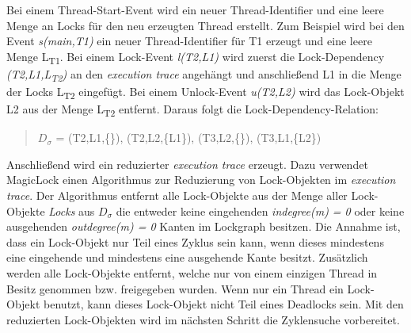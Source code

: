 Bei einem Thread-Start-Event wird ein neuer Thread-Identifier und eine leere
Menge an Locks für den neu erzeugten Thread erstellt. Zum Beispiel wird bei den
Event \textit{s(main,T1)} ein neuer Thread-Identifier für T1 erzeugt und eine
leere Menge L\textsubscript{T1}. Bei einem Lock-Event \textit{l(T2,L1)} wird
zuerst die Lock-Dependency \textit{(T2,L1,L\textsubscript{T2})} an den
\textit{execution trace} angehängt und anschließend L1 in die Menge der Locks
L\textsubscript{T2} eingefügt. Bei einem Unlock-Event \textit{u(T2,L2)} wird das
Lock-Objekt L2 aus der Menge L\textsubscript{T2} entfernt. Daraus folgt die
Lock-Dependency-Relation:
\begin{quote}
  \textbf{$D_\sigma$} = (T2,L1,\{\}), (T2,L2,\{L1\}), (T3,L2,\{\}),
  (T3,L1,\{L2\})
\end{quote}
Anschließend wird ein reduzierter \textit{execution trace} erzeugt. Dazu
verwendet MagicLock einen Algorithmus zur Reduzierung von Lock-Objekten im
\textit{execution trace}. Der Algorithmus entfernt alle Lock-Objekte aus der
Menge aller Lock-Objekte \textit{Locks} aus \textit{$D_\sigma$} die entweder
keine eingehenden \textit{indegree(m) = 0} oder keine ausgehenden
\textit{outdegree(m) = 0} Kanten im Lockgraph besitzen. Die Annahme ist, dass
ein Lock-Objekt nur Teil eines Zyklus sein kann, wenn dieses mindestens eine
eingehende und mindestens eine ausgehende Kante besitzt. Zusätzlich werden alle
Lock-Objekte entfernt, welche nur von einem einzigen Thread in Besitz genommen
bzw. freigegeben wurden. Wenn nur ein Thread ein Lock-Objekt benutzt, kann
dieses Lock-Objekt nicht Teil eines Deadlocks sein. Mit den reduzierten
Lock-Objekten wird im nächsten Schritt die Zyklensuche vorbereitet.

